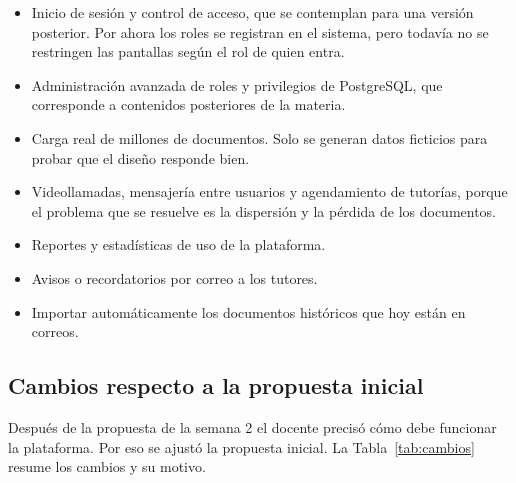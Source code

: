 \begin{itemize}[leftmargin=1.2cm]
  \item Inicio de sesión y control de acceso, que se contemplan para una versión posterior.
        Por ahora los roles se registran en el sistema, pero todavía no se restringen las
        pantallas según el rol de quien entra.
  \item Administración avanzada de roles y privilegios de PostgreSQL, que corresponde a
        contenidos posteriores de la materia.
  \item Carga real de millones de documentos. Solo se generan datos ficticios para
        probar que el diseño responde bien.
  \item Videollamadas, mensajería entre usuarios y agendamiento de tutorías, porque el
        problema que se resuelve es la dispersión y la pérdida de los documentos.
  \item Reportes y estadísticas de uso de la plataforma.
  \item Avisos o recordatorios por correo a los tutores.
  \item Importar automáticamente los documentos históricos que hoy están en correos.
\end{itemize}

\subsection{Cambios respecto a la propuesta inicial}

Después de la propuesta de la semana 2 el docente precisó cómo debe funcionar la
plataforma. Por eso se ajustó la propuesta inicial. La Tabla~\ref{tab:cambios} resume
los cambios y su motivo.


